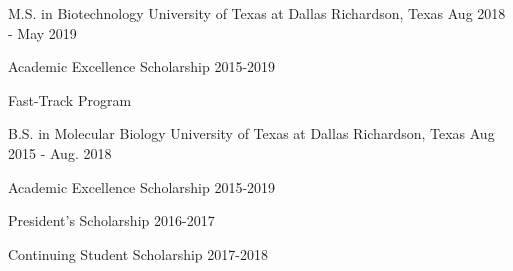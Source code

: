 

\begin{cventries}

	\cventry
	{M.S. in Biotechnology} %
	{University of Texas at Dallas} %
	{Richardson, Texas} %
	{Aug 2018 - May 2019} %
	{
		\begin{cvitems} %
			\item {Academic Excellence Scholarship 2015-2019}
			\item {Fast-Track Program}
		\end{cvitems}
	}

	\cventry
	{B.S. in Molecular Biology} %
	{University of Texas at Dallas} %
	{Richardson, Texas} %
	{Aug 2015 - Aug. 2018} %
	{
		\begin{cvitems} %
			\item {Academic Excellence Scholarship 2015-2019}
			\item {President's Scholarship 2016-2017}
			\item {Continuing Student Scholarship 2017-2018}
		\end{cvitems}
	}

\end{cventries}
